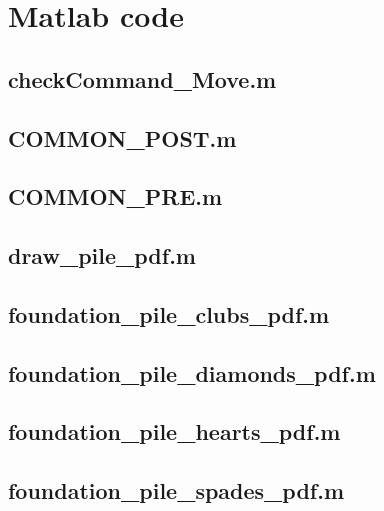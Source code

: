 \documentclass[runningheads,a4paper]{llncs}
\newcommand{\GPenSIM}{../GPenSIM}
\begin{document}
\section{Matlab code}	
\subsection{checkCommand\_Move.m}
\label{app:checkCommand_Move}


\subsection{COMMON\_POST.m}
\label{app:COMMON_POST}


\subsection{COMMON\_PRE.m}
\label{app:COMMON_PRE}


\subsection{draw\_pile\_pdf.m}
\label{app:draw_pile_pdf}


\subsection{foundation\_pile\_clubs\_pdf.m}
\label{app:foundation_pile_clubs_pdf}


\subsection{foundation\_pile\_diamonds\_pdf.m}
\label{app:foundation_pile_diamonds_pdf}


\subsection{foundation\_pile\_hearts\_pdf.m}
\label{app:foundation_pile_hearts_pdf}


\subsection{foundation\_pile\_spades\_pdf.m}
\label{app:foundation_pile_spades_pdf}

\end{document}
